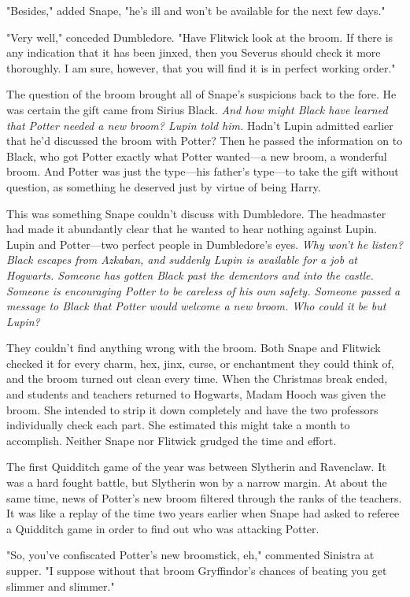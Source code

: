 "Besides," added Snape, "he's ill and won't be available for the next few days."

"Very well," conceded Dumbledore. "Have Flitwick look at the broom. If there is any indication that it has been jinxed, then you Severus should check it more thoroughly. I am sure, however, that you will find it is in perfect working order."

The question of the broom brought all of Snape's suspicions back to the fore. He was certain the gift came from Sirius Black. \emph{And how might Black have learned that Potter needed a new broom? Lupin told him.} Hadn't Lupin admitted earlier that he'd discussed the broom with Potter? Then he passed the information on to Black, who got Potter exactly what Potter wanted—a new broom, a wonderful broom. And Potter was just the type—his father's type—to take the gift without question, as something he deserved just by virtue of being Harry.

This was something Snape couldn't discuss with Dumbledore. The headmaster had made it abundantly clear that he wanted to hear nothing against Lupin. Lupin and Potter—two perfect people in Dumbledore's eyes. \emph{Why won't he listen? Black escapes from Azkaban, and suddenly Lupin is available for a job at Hogwarts. Someone has gotten Black past the dementors and into the castle. Someone is encouraging Potter to be careless of his own safety. Someone passed a message to Black that Potter would welcome a new broom. Who could it be but Lupin?}

They couldn't find anything wrong with the broom. Both Snape and Flitwick checked it for every charm, hex, jinx, curse, or enchantment they could think of, and the broom turned out clean every time. When the Christmas break ended, and students and teachers returned to Hogwarts, Madam Hooch was given the broom. She intended to strip it down completely and have the two professors individually check each part. She estimated this might take a month to accomplish. Neither Snape nor Flitwick grudged the time and effort.

The first Quidditch game of the year was between Slytherin and Ravenclaw. It was a hard fought battle, but Slytherin won by a narrow margin. At about the same time, news of Potter's new broom filtered through the ranks of the teachers. It was like a replay of the time two years earlier when Snape had asked to referee a Quidditch game in order to find out who was attacking Potter.

"So, you've confiscated Potter's new broomstick, eh," commented Sinistra at supper. "I suppose without that broom Gryffindor's chances of beating you get slimmer and slimmer."

